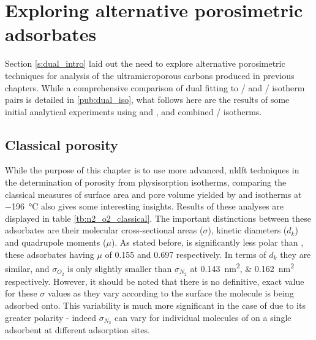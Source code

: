 \section[Exploring alternative porosimetric adsorbates]{Exploring alternative porosimetric \glspl{adsorbate}}
\label{s:dual_initial}
Section \ref{s:dual_intro} laid out the need to explore alternative porosimetric techniques for analysis of the ultramicroporous carbons produced in previous chapters. While a comprehensive comparison of dual fitting to / and / isotherm pairs is detailed in \ref{pub:dual_iso}, what follows here are the results of some initial analytical experiments using  and , and combined / isotherms.

\subsection{Classical porosity}

While the purpose of this chapter is to use more advanced, \acrshort{nldft} techniques in the determination of porosity from \gls{physisorption} isotherms, comparing the classical measures of surface area and pore volume yielded by  and  isotherms at \qty{-196}{\degreeCelsius} also gives some interesting insights. Results of these analyses are displayed in table \ref{tb:n2_o2_classical}. The important distinctions between these \glspl{adsorbate} are their molecular cross-sectional areas ($\sigma$), kinetic diameters ($d_k$) and quadrupole moments ($\mu$). As stated before,  is significantly less polar than , these \glspl{adsorbate} having $\mu$ of 0.155 and 0.697 respectively.\citep{Lide2007Handbook, Poling2001Properties, Graham1998Measurement} In terms of $d_k$ they are similar, and $\sigma_{O_2}$ is only slightly smaller than $\sigma_{N_2}$ at \qtylist[list-units=single]{0.143; 0.162}{\nm\squared}  respectively. However, it should be noted that there is no definitive, exact value for these $\sigma$ values as they vary according to the surface the molecule is being adsorbed onto.\citep{kodera1959molecular, kodera1960molecular, livingston1949cross} This variability is much more significant in the case of  due to its greater polarity - indeed $\sigma_{N_2}$ can vary for individual molecules of  on a single \gls{adsorbent} at different \gls{adsorption} sites.\citep{Jagiello2020Exploiting}

